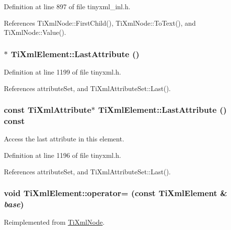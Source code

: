 Definition at line 897 of file tinyxml\_\-inl.h.

References TiXmlNode::FirstChild(), TiXmlNode::ToText(), and TiXmlNode::Value().\hypertarget{class_ti_xml_element_a222f81cf06155cd108f2a68d4d176004}{
\subsubsection[{LastAttribute}]{$\ast$ TiXmlElement::LastAttribute ()}}
\label{class_ti_xml_element_a222f81cf06155cd108f2a68d4d176004}


Definition at line 1199 of file tinyxml.h.

References attributeSet, and TiXmlAttributeSet::Last().\hypertarget{class_ti_xml_element_a86191b49f9177be132b85b14655f1381}{
\subsubsection[{LastAttribute}]{\setlength{\rightskip}{0pt plus 5cm}const {\bf TiXmlAttribute}$\ast$ TiXmlElement::LastAttribute () const}}
\label{class_ti_xml_element_a86191b49f9177be132b85b14655f1381}


Access the last attribute in this element. 

Definition at line 1196 of file tinyxml.h.

References attributeSet, and TiXmlAttributeSet::Last().\hypertarget{class_ti_xml_element_af5cd4156e082ef3bf23adfe0ed173340}{
\subsubsection[{operator=}]{\setlength{\rightskip}{0pt plus 5cm}void TiXmlElement::operator= (const {\bf TiXmlElement} \& {\em base})}}
\label{class_ti_xml_element_af5cd4156e082ef3bf23adfe0ed173340}


Reimplemented from \hyperlink{class_ti_xml_node_a9eb62a8d95b8a98ec2df481cc9e5a7e2}{TiXmlNode}.

